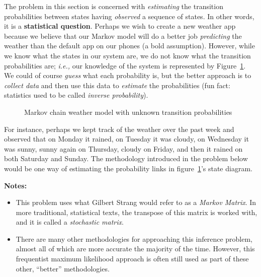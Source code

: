 \documentclass[12pt,reqno]{article}
\theoremstyle{definition}
\numberwithin{equation}{section}
\begin{document}
The problem in this section is concerned with \textit{estimating} the transition probabilities between states
having \textit{observed} a sequence of states. In other words, it is a \textbf{statistical question}. Perhaps
we wish to create a new weather app because we believe that our Markov model will do a better job \textit{predicting}
the weather than the default app on our phones (a bold assumption). However, while we know what the states in our system
are, we do not know what the transition probabilities are; \textit{i.e.,} our knowledge of the system is represented by Figure~\ref{fig:markov_unknown}.
We could of course \textit{guess} what each probability is, but the better approach is to \textit{collect data}
and then use this data to \textit{estimate} the probabilities (fun fact: statistics used to be called \textit{inverse probability}). 
\begin{figure}[htbp]
    \centering
{}
    \caption{Markov chain weather model with unknown transition probabilities}
    \label{fig:markov_unknown}
\end{figure}


For instance, perhaps we kept
track of the weather over the past week and observed that on Monday it rained, on Tuesday it was cloudy,
on Wednesday it was sunny, sunny again on Thursday, cloudy on Friday, and then it rained on both Saturday and
Sunday. The methodology introduced in the problem below would be one way of estimating the probability links
in figure~\ref{fig:markov_unknown}'s state diagram.

\noindent \textbf{Notes:} 
\begin{itemize}
    \item This problem uses what Gilbert Strang would refer to as a \textit{Markov Matrix}. In 
    more traditional, statistical texts, the transpose of this matrix is worked with, and it is called a \textit{stochastic matrix}.
    \item There are many other methodologies for approaching this inference problem, almost all of which
    are more accurate the majority of the time. However, this frequentist maximum likelihood approach is often still used as
    part of these other, ``better'' methodologies.
\end{itemize}
\end{document}

